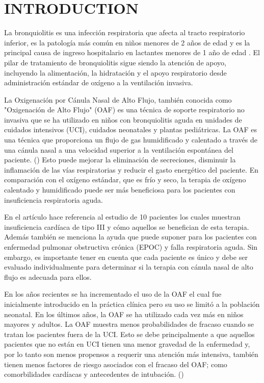 \section{INTRODUCTION} \label{sec:itroduction}

La bronquiolitis es una infección respiratoria que afecta al tracto respiratorio inferior, es la patología más común en niños menores de 2 años de edad y es la principal causa de ingreso hospitalario en lactantes menores de 1 año de edad . El pilar de tratamiento de bronquiolitis sigue siendo la atención de apoyo, incluyendo la alimentación, la hidratación y el apoyo respiratorio desde administración estándar de oxígeno a la ventilación invasiva. 

La Oxigenación por Cánula Nasal de Alto Flujo, también conocida como "Oxigenación de Alto Flujo" (OAF) es una técnica de soporte respiratorio no invasiva que se ha utilizado en niños con bronquiolitis aguda en unidades de cuidados intensivos (UCI), cuidados neonatales y plantas pediátricas. La OAF es una técnica que proporciona un flujo de gas humidificado y calentado a través de una cánula nasal a una velocidad superior a la ventilación espontánea del paciente. (\cite{Daverio2019}) Esto puede mejorar la eliminación de secreciones, disminuir la inflamación de las vías respiratorias y reducir el gasto energético del paciente. En comparación con el oxígeno estándar, que es frío y seco, la terapia de oxígeno calentado y humidificado puede ser más beneficiosa para los pacientes con insuficiencia respiratoria aguda. 

En el artículo \cite{Lodeserto2018} hace referencia al estudio de 10 pacientes los cuales muestran insuficiencia cardíaca de tipo III y cómo aquellos se benefician de esta terapia. Además también se menciona la ayuda que puede suponer para los pacientes con enfermedad pulmonar obstructiva crónica (EPOC) y falla respiratoria aguda. Sin embargo, es importante tener en cuenta que cada paciente es único y debe ser evaluado individualmente para determinar si la terapia con cánula nasal de alto flujo es adecuada para ellos.

En los años recientes se ha incrementado el uso de la OAF el cual fue inicialmente introducido en la práctica clínica pero su uso se limitó a la población neonatal. En los últimos años, la OAF se ha utilizado cada vez más en niños mayores y adultos. La OAF muestra menos probabilidades de fracaso cuando se tratan los pacientes fuera de la UCI. Esto se debe principalmente a que aquellos pacientes que no están en UCI tienen una menor gravedad de la enfermedad y, por lo tanto son menos propensos a requerir una atención más intensiva, también tienen menos factores de riesgo asociados con el fracaso del OAF; como comorbilidades cardíacas y antecedentes de intubación. (\cite{Betters2017}) 



